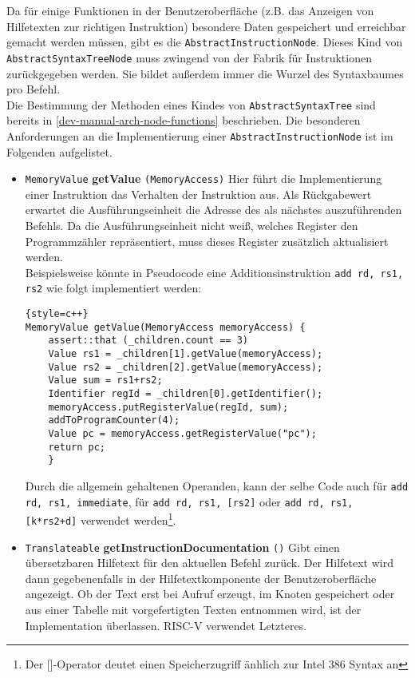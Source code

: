 Da für einige Funktionen in der Benutzeroberfläche (z.B. das Anzeigen von
Hilfetexten zur richtigen Instruktion) besondere Daten gespeichert und
erreichbar gemacht werden müssen, gibt es die \texttt{AbstractInstructionNode}.
Dieses Kind von \texttt{AbstractSyntaxTreeNode} muss zwingend von der Fabrik für
Instruktionen zurückgegeben werden. Sie bildet außerdem immer die Wurzel des
Syntaxbaumes pro Befehl.\\
Die Bestimmung der Methoden eines Kindes von \texttt{AbstractSyntaxTree} sind bereits in \autoref{dev-manual-arch-node-functions} beschrieben. Die besonderen Anforderungen an die Implementierung einer \texttt{AbstractInstructionNode} ist im Folgenden aufgelistet.

\begin{itemize}

  \item \texttt{MemoryValue} \textbf{getValue} \texttt{(MemoryAccess)} Hier
  führt die Implementierung einer Instruktion das Verhalten der Instruktion aus.
  Als Rückgabewert erwartet die Ausführungseinheit die Adresse des als nächstes
  auszuführenden Befehls. Da die Ausführungseinheit nicht weiß, welches Register
  den Programmzähler repräsentiert, muss dieses Register zusätzlich aktualisiert
  werden. \\ Beispielsweise könnte in Pseudocode eine Additionsinstruktion
  \texttt{add rd, rs1, rs2} wie folgt implementiert werden:

\begin{lstlisting}{style=c++}
MemoryValue getValue(MemoryAccess memoryAccess) {
	assert::that (_children.count == 3)
	Value rs1 = _children[1].getValue(memoryAccess);
	Value rs2 = _children[2].getValue(memoryAccess);
	Value sum = rs1+rs2;
	Identifier regId = _children[0].getIdentifier();
	memoryAccess.putRegisterValue(regId, sum);
	addToProgramCounter(4);
	Value pc = memoryAccess.getRegisterValue("pc");
	return pc;
	}
\end{lstlisting}

	Durch die allgemein gehaltenen Operanden, kann der selbe Code auch für
	\texttt{add rd, rs1, immediate}, für \texttt{add rd, rs1, [rs2]} oder
	\texttt{add rd, rs1, [k*rs2+d]} verwendet werden\footnote{Der []-Operator
	deutet einen Speicherzugriff änhlich zur Intel 386 Syntax an}.

  \item \texttt{Translateable} \textbf{getInstructionDocumentation} \texttt{()}
  Gibt einen übersetzbaren Hilfetext für den aktuellen Befehl zurück. Der
  Hilfetext wird dann gegebenenfalls in der Hilfetextkomponente der
  Benutzeroberfläche angezeigt. Ob der Text erst bei Aufruf erzeugt, im Knoten
  gespeichert oder aus einer Tabelle mit vorgefertigten Texten entnommen wird,
  ist der Implementation überlassen. RISC-V verwendet Letzteres.

\end{itemize}

